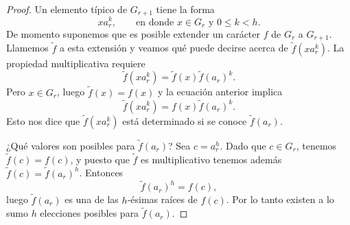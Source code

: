 \documentclass[12pt,a4paper]{book}
\begin{document}
\begin{proof}
        Un elemento típico de $G_{r+1}$ tiene la forma
        \begin{equation*}
            xa_{r}^{k},\qquad\text{en donde }x\in G_{r}\text{ y }0\leq k<h.
        \end{equation*}
        De momento suponemos que es posible extender un carácter $f$ de $G_{r}$ a $G_{r+1}$.
        Llamemos $\tilde{f}$ a esta extensión y veamos qué puede decirse acerca de
        $\tilde{f}(xa_{r}^{k})$. La propiedad multiplicativa requiere
        \begin{equation*}
            \tilde{f}(xa_{r}^{k})=\tilde{f}(x)\tilde{f}(a_{r})^{k}.
        \end{equation*}
        Pero $x\in G_{r}$, luego $\tilde{f}(x)=f(x)$ y la ecuación anterior implica
        \begin{equation*}
            \tilde{f}(xa_{r}^{k})=f(x)\tilde{f}(a_{r})^{k}.
        \end{equation*}
        Esto nos dice que $\tilde{f}(xa_{r}^{k})$ está determinado si se conoce
        $\tilde{f}(a_{r})$.

        ¿Qué valores son posibles para $\tilde{f}(a_{r})$? Sea $c=a_{r}^{h}$. Dado que
        $c\in G_{r}$, tenemos $\tilde{f}(c)=f(c)$, y puesto que $\tilde{f}$ es
        multiplicativo tenemos además $\tilde{f}(c)=\tilde{f}(a_{r})^{h}$. Entonces
        \begin{equation*}
            \tilde{f}(a_{r})^{h}=f(c),
        \end{equation*}
        luego $\tilde{f}(a_{r})$ es una de las $h$-ésimas raíces de $f(c)$. Por lo tanto
        existen a lo sumo $h$ elecciones posibles para $\tilde{f}(a_{r})$.


\end{proof}
\end{document}
